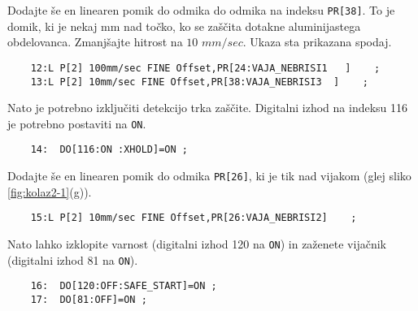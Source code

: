 Dodajte še en linearen pomik do odmika do odmika na indeksu \verb*|PR[38]|. To je domik, ki je nekaj mm nad točko, ko se zaščita dotakne aluminijastega obdelovanca. Zmanjšajte hitrost na $10$ $mm/sec$. Ukaza sta prikazana spodaj.

\vspace{0.35cm}
\begin{mdframed}[backgroundcolor=orange!20, shadow=true,roundcorner=8pt]
	
	\begin{verbatim}
	12:L P[2] 100mm/sec FINE Offset,PR[24:VAJA_NEBRISI1   ]    ;
	13:L P[2] 10mm/sec FINE Offset,PR[38:VAJA_NEBRISI3  ]    ;
	\end{verbatim}
	
\end{mdframed}

Nato je potrebno izključiti detekcijo trka zaščite. Digitalni izhod na indeksu 116 je potrebno postaviti na \verb*|ON|.

\vspace{0.35cm}
\begin{mdframed}[backgroundcolor=orange!20, shadow=true,roundcorner=8pt]
	
	\begin{verbatim}
	14:  DO[116:ON :XHOLD]=ON ;
	\end{verbatim}
	
\end{mdframed}

Dodajte še en linearen pomik do odmika \verb*|PR[26]|, ki je tik nad vijakom (glej sliko \ref{fig:kolaz2-1}(g)).

\vspace{0.35cm}
\begin{mdframed}[backgroundcolor=orange!20, shadow=true,roundcorner=8pt]
	
	\begin{verbatim}
	15:L P[2] 10mm/sec FINE Offset,PR[26:VAJA_NEBRISI2]    ;
	\end{verbatim}
	
\end{mdframed}

Nato lahko izklopite varnost (digitalni izhod 120 na \verb*|ON|) in zaženete vijačnik (digitalni izhod 81 na \verb*|ON|).

\vspace{0.35cm}
\begin{mdframed}[backgroundcolor=orange!20, shadow=true,roundcorner=8pt]
	
	\begin{verbatim}
	16:  DO[120:OFF:SAFE_START]=ON ;
	17:  DO[81:OFF]=ON ;
	\end{verbatim}
	
\end{mdframed}

